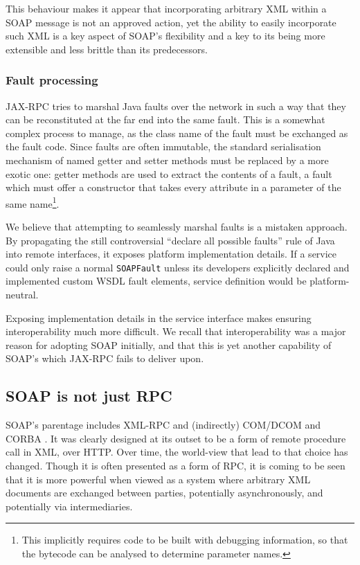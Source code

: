 This behaviour makes it appear that incorporating arbitrary XML within
a SOAP message is not an approved action, yet the ability to easily
incorporate such XML is a key aspect of SOAP's flexibility and a key
to its being more extensible and less brittle than its predecessors.

\subsubsection{Fault processing}
\label{objections:soap-not-rmi:faults}

JAX-RPC tries to marshal Java faults over the network in such a way
that they can be reconstituted at the far end into the same fault.
This is a somewhat complex process to manage, as the class name of the
fault must be exchanged as the fault code. Since faults are often
immutable, the standard serialisation mechanism of named getter and
setter methods must be replaced by a more exotic one: getter methods
are used to extract the contents of a fault, a fault which must offer
a constructor that takes every attribute in a parameter of the same
name\footnote{This implicitly requires code to be built with debugging
information, so that the bytecode can be analysed to determine
parameter names.}.

We believe that attempting to seamlessly marshal faults is a mistaken
approach.  By propagating the still controversial ``declare all
possible faults'' rule of Java into remote interfaces, it exposes
platform implementation details. If a service could only raise a
normal {\tt SOAPFault} unless its developers explicitly declared and
implemented custom WSDL fault elements, service definition would be
platform-neutral.


Exposing implementation details in the service interface makes ensuring
interoperability much more difficult. We recall that interoperability
was a major reason for adopting SOAP initially, and that this is yet
another capability of SOAP's which JAX-RPC fails to deliver upon.

\subsection{SOAP is not just RPC}
\label{objections:soap-not-just-rmi}

SOAP's parentage includes XML-RPC \cite{winer:xmlrpc} and (indirectly)
COM/DCOM and CORBA \cite{dbox:SoapHistory,dbox:com, vinoski:CORBA}. It was clearly
designed at its outset to be a form of remote procedure call in XML,
over HTTP. Over time, the world-view that lead to that choice has
changed. Though it is often presented as a form of RPC, it is coming
to be seen that it is more powerful when viewed as a system where
arbitrary XML documents are exchanged between parties, potentially
asynchronously, and potentially via intermediaries.

